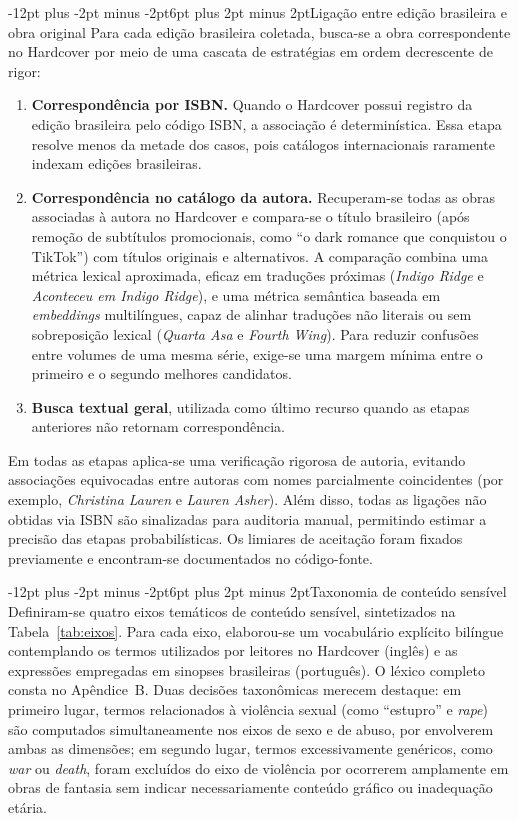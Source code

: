 \documentclass[12pt]{article}
\makeatletter
\renewcommand{\subsection}{\@startsection{subsection}{2}{\z@}%
  {-12pt plus -2pt minus -2pt}{6pt plus 2pt minus 2pt}{\normalfont\normalsize\bfseries}}
\makeatother
\begin{document}
\subsection{Ligação entre edição brasileira e obra original}
\label{sec:ponte}
Para cada edição brasileira coletada, busca-se a obra correspondente no Hardcover por meio de uma cascata de estratégias em ordem decrescente de rigor:
\begin{enumerate}
  \item \textbf{Correspondência por ISBN.} Quando o Hardcover possui registro da edição brasileira pelo código ISBN, a associação é determinística. Essa etapa resolve menos da metade dos casos, pois catálogos internacionais raramente indexam edições brasileiras.
  \item \textbf{Correspondência no catálogo da autora.} Recuperam-se todas as obras associadas à autora no Hardcover e compara-se o título brasileiro (após remoção de subtítulos promocionais, como ``o dark romance que conquistou o TikTok'') com títulos originais e alternativos. A comparação combina uma métrica lexical aproximada, eficaz em traduções próximas (\emph{Indigo Ridge} e \emph{Aconteceu em Indigo Ridge}), e uma métrica semântica baseada em \emph{embeddings} multilíngues, capaz de alinhar traduções não literais ou sem sobreposição lexical (\emph{Quarta Asa} e \emph{Fourth Wing}). Para reduzir confusões entre volumes de uma mesma série, exige-se uma margem mínima entre o primeiro e o segundo melhores candidatos.
  \item \textbf{Busca textual geral}, utilizada como último recurso quando as etapas anteriores não retornam correspondência.
\end{enumerate}
Em todas as etapas aplica-se uma verificação rigorosa de autoria, evitando associações equivocadas entre autoras com nomes parcialmente coincidentes (por exemplo, \emph{Christina Lauren} e \emph{Lauren Asher}). Além disso, todas as ligações não obtidas via ISBN são sinalizadas para auditoria manual, permitindo estimar a precisão das etapas probabilísticas. Os limiares de aceitação foram fixados previamente e encontram-se documentados no código-fonte.

\subsection{Taxonomia de conteúdo sensível}
\label{sec:taxonomia}
Definiram-se quatro eixos temáticos de conteúdo sensível, sintetizados na Tabela~\ref{tab:eixos}. Para cada eixo, elaborou-se um vocabulário explícito bilíngue contemplando os termos utilizados por leitores no Hardcover (inglês) e as expressões empregadas em sinopses brasileiras (português). O léxico completo consta no Apêndice~B. Duas decisões taxonômicas merecem destaque: em primeiro lugar, termos relacionados à violência sexual (como ``estupro'' e \emph{rape}) são computados simultaneamente nos eixos de sexo e de abuso, por envolverem ambas as dimensões; em segundo lugar, termos excessivamente genéricos, como \emph{war} ou \emph{death}, foram excluídos do eixo de violência por ocorrerem amplamente em obras de fantasia sem indicar necessariamente conteúdo gráfico ou inadequação etária.
\end{document}
